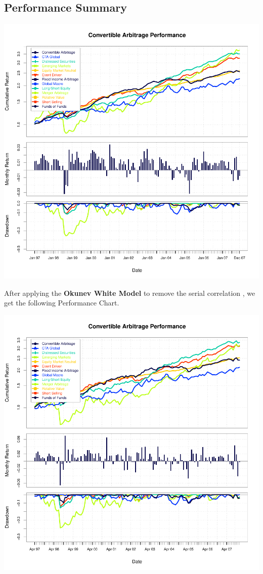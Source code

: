 \documentclass[12pt,letterpaper,english]{article}
\begin{document}
\subsection{ Performance Summary}
\includegraphics{UnSmoothReturnAnalysis-003}

After applying the \textbf{Okunev White Model} to remove the serial correlation , we get the following Performance Chart.

\includegraphics{UnSmoothReturnAnalysis-004}
\end{document}
